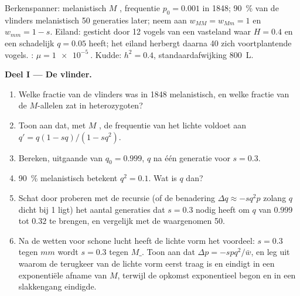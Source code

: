 \begin{problem}
\label{pb:b2:population-genetics:1}
Berkenspanner: melanistisch  $M$ , frequentie $p_0 = 0.001$
in 1848; \qty{90}{\%} van de vlinders melanistisch 50 generaties later; neem aan
$w_{MM} = w_{Mm} = 1$ en $w_{mm} = 1 - s$. Eiland: gesticht door 12
vogels van een vasteland waar $H = 0.4$ en een  schadelijk
 $q = 0.05$ heeft; het eiland herbergt daarna 40 zich voortplantende
vogels. : $\mu = \qty{1e-5}{}$. Kudde: $h^{2} = 0.4$,
standaardafwijking \qty{800}{L}.

\medskip
\noindent\textbf{Deel I --- De vlinder.}
\begin{enumerate}
  \item Welke fractie van de vlinders was in 1848 melanistisch, en welke
        fractie van de $M$-allelen zat in heterozygoten?
  \item Toon aan dat, met $M$ , de frequentie van het lichte
         voldoet aan $q' = q(1 - sq)/(1 - sq^{2})$.
  \item Bereken, uitgaande van $q_0 = 0.999$, $q$ na één generatie
        voor $s = 0.3$.
  \item \qty{90}{\%} melanistisch betekent $q^{2} = 0.1$. Wat is $q$ dan?
  \item Schat door proberen met de recursie (of de benadering
        $\Delta q \approx -sq^{2}p$ zolang $q$ dicht bij 1 ligt) het
        aantal generaties dat $s = 0.3$ nodig heeft om $q$ van $0.999$
        tot $0.32$ te brengen, en vergelijk met de waargenomen 50.
  \item Na de wetten voor schone lucht heeft de lichte vorm het voordeel: $s
        = 0.3$ tegen $mm$ wordt $s = 0.3$ tegen $M\_$. Toon aan
        dat $\Delta p = -spq^{2}/\bar w$, en leg uit waarom de terugkeer
        van de lichte vorm eerst traag is en eindigt in een exponentiële
        afname van $M$, terwijl de opkomst exponentieel begon en
        in een slakkengang eindigde.
\end{enumerate}


\end{problem}
